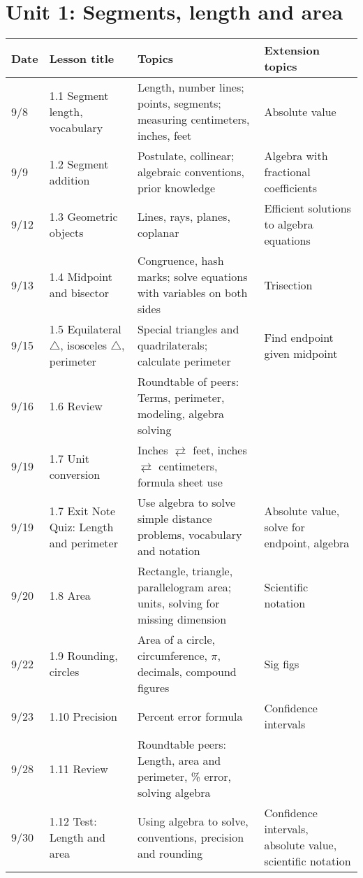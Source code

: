 

\geometry{hoffset=-0.5in, textwidth=7.5in}

\fancyhead[RE]{\thepage}
\fancyhead[RO]{\thepage }%



\section*{Unit 1: Segments, length and area}
\begin{tabular}{|p{0.9cm}|p{4cm}|p{7cm}|p{5cm}|}
  \hline
  Date & Lesson title & Topics  & Extension topics \\
  \hline
  9/8 & 1.1 Segment length, vocabulary & Length, number lines; points, segments; measuring centimeters, inches, feet & Absolute value \\
  \hline
  9/9 & 1.2 Segment addition & Postulate, collinear; algebraic conventions, prior knowledge & Algebra with fractional coefficients \\
  \hline
  9/12 & 1.3 Geometric objects & Lines, rays, planes, coplanar & Efficient solutions to algebra equations \\
  \hline
  9/13 & 1.4 Midpoint and bisector & Congruence, hash marks; solve equations with variables on both sides & Trisection \\
  \hline
  9/15 & 1.5 Equilateral $\triangle$, isosceles $\triangle$, perimeter & Special triangles and quadrilaterals; calculate perimeter & Find endpoint given midpoint \\
  \hline
  9/16 & 1.6 Review & Roundtable of peers: Terms, perimeter, modeling, algebra solving & \\
  \hline
  9/19 & 1.7 Unit conversion & Inches $\rightleftarrows$ feet, inches $\rightleftarrows$ centimeters, formula sheet use & \\
  \hline
  9/19 & 1.7 Exit Note Quiz: Length and perimeter & Use algebra to solve simple distance problems, vocabulary and notation & Absolute value, solve for endpoint, algebra \\
  \hline
  9/20 & 1.8 Area & Rectangle, triangle, parallelogram area; units, solving for missing dimension & Scientific notation \\
  \hline
  9/22 & 1.9 Rounding, circles & Area of a circle, circumference, $\pi$, decimals, compound figures & Sig figs \\
  \hline
  9/23 & 1.10 Precision & Percent error formula & Confidence intervals \\
  \hline
  9/28 & 1.11 Review & Roundtable peers: Length, area and perimeter, \% error, solving algebra & \\
  \hline
  9/30 & 1.12 Test: Length and area & Using algebra to solve, conventions, precision and rounding & Confidence intervals, absolute value, scientific notation \\
  \hline

\end{tabular} \par \vspace*{0.3cm}

